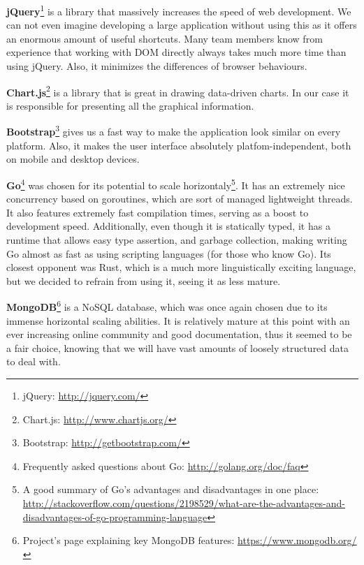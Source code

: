 \documentclass{l3proj}
\begin{document}
\textbf{jQuery}\footnote{\raggedright{}jQuery: \url{http://jquery.com/}} is a library that massively increases the speed of web development. We can not even imagine developing a large application without using this as it offers an enormous amount of useful shortcuts. Many team members know from experience that working with DOM directly always takes much more time than using jQuery. Also, it minimizes the differences of browser behaviours.

\textbf{Chart.js}\footnote{\raggedright{}Chart.js: \url{http://www.chartjs.org/}} is a library that is great in drawing data-driven charts. In our case it is responsible for presenting all the graphical information.

\textbf{Bootstrap}\footnote{\raggedright{}Bootstrap: \url{http://getbootstrap.com/}} gives us a fast way to make the application look similar on every platform. Also, it makes the user interface absolutely platfom-independent, both on mobile and desktop devices.

\textbf{Go}\footnote{\raggedright{}Frequently asked questions about Go: \url{http://golang.org/doc/faq}} was chosen for its potential to scale horizontaly\footnote{\raggedright{}A good summary of Go's advantages and disadvantages in one place: \url{http://stackoverflow.com/questions/2198529/what-are-the-advantages-and-disadvantages-of-go-programming-language}}. It has an extremely nice concurrency based on goroutines, which are sort of managed lightweight threads. It also features extremely fast compilation times, serving as a boost to development speed. Additionally, even though it is statically typed, it has a runtime that allows easy type assertion, and garbage collection, making writing Go almost as fast as using scripting languages (for those who know Go). Its closest opponent was Rust, which is a much more linguistically exciting language, but we decided to refrain from using it, seeing it as less mature.

\textbf{MongoDB}\footnote{\raggedright{Project's page explaining key MongoDB features: \url{https://www.mongodb.org/}}} is a NoSQL database, which was once again chosen due to its immense horizontal scaling abilities. It is relatively mature at this point with an ever increasing online community and good documentation, thus it seemed to be a fair choice, knowing that we will have vast amounts of loosely structured data to deal with.

\end{document}
